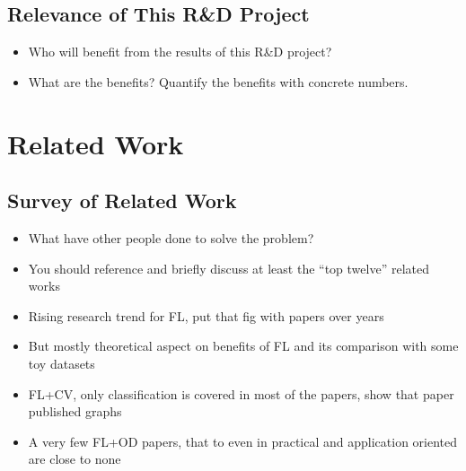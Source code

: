 \documentclass[thesis]{mas_proposal}
\begin{document}
\subsection{Relevance of This R\&D Project}
\begin{itemize}

      \item Who will benefit from the results of this R\&D project?
      \item What are the benefits? Quantify the benefits with concrete numbers.
\end{itemize}

\section{Related Work}

\subsection{Survey of Related Work}
\begin{itemize}



      \item What have other people done to solve the problem?
      \item You should reference and briefly discuss at least the ``top twelve'' related works
      \item Rising research trend for FL, put that fig with papers over years
      \item But mostly theoretical aspect on benefits of FL and its comparison with some toy datasets 
      \item FL+CV, only classification is covered in most of the papers, show that paper published graphs
      \item A very few FL+OD papers, that to even in practical and application oriented are close to none
      
\end{itemize}
\end{document}
